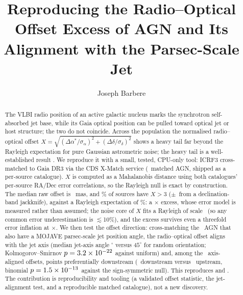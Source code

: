 \documentclass[twocolumn]{aastex631}
\newcommand{\xnorm}{\ensuremath{X}}
\begin{document}
\title{Reproducing the Radio--Optical Offset Excess of AGN and Its Alignment with the
Parsec-Scale Jet}

\author[0009-0008-3289-4447]{Joseph Barbere}

\begin{abstract}
The VLBI radio position of an active galactic nucleus marks the synchrotron self-absorbed jet base,
while its Gaia optical position can be pulled toward optical jet or host structure; the two do not
coincide. Across the population the normalised radio--optical offset
$\xnorm=\sqrt{(\Delta\alpha^*/\sigma_\alpha)^2+(\Delta\delta/\sigma_\delta)^2}$ shows a heavy tail far
beyond the Rayleigh expectation for pure Gaussian astrometric noise; the heavy tail is a
well-established result \citep{mignard2016,petrovkovalev2017L,kovalev2017,lindegren2018,plavin2019}.
We reproduce it with a small, tested, CPU-only tool: ICRF3 \citep{icrf3} cross-matched to Gaia DR3
\citep{gaiadr3} via the CDS X-Match service \citep{cdsxmatch} (\offN\ matched AGN, shipped as a
per-source catalogue). $\xnorm$ is computed as a Mahalanobis distance using both catalogues'
per-source RA/Dec error correlations, so the Rayleigh null is exact by construction. The median raw
offset is \offMedian~mas, and \offFracTail\% of sources have $\xnorm>3$
($\pm$\offFracTailJkSe\ from a declination-band jackknife), against a Rayleigh expectation of
\offRayleigh\%: a \offExcess$\times$ excess, whose error model is measured rather than assumed;
the noise core of $\xnorm$ fits a Rayleigh of scale \offCoreScale\ (so any common error
underestimation is $\lesssim$10\%), and the excess survives even a threefold error inflation at
\offInflThree$\times$. We then test the offset direction: cross-matching the \offJetN\ AGN that
also have a MOJAVE \citep{lister2021} parsec-scale jet position angle, the radio--optical offset
aligns with the jet axis (median jet-axis angle \offJetMedAxis$^\circ$ versus $45^\circ$ for random
orientation; Kolmogorov--Smirnov $p=3.2\times10^{-22}$ against uniform) and, among the \offNaligned\
axis-aligned offsets, points preferentially downstream (\offNdown\ downstream versus \offNup\
upstream, binomial $p=1.5\times10^{-13}$ against the sign-symmetric null). This reproduces
\citet{kovalev2017} and \citet{plavin2019}. The contribution is reproducibility and tooling (a
validated offset statistic, the jet-alignment test, and a reproducible matched catalogue), not a
new discovery.
\end{abstract}

\end{document}
